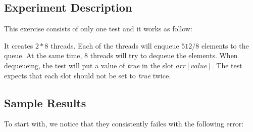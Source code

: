 \subsection{Experiment Description}
\par
This exercise consists of only one test and it works as follow:
\par
It creates $2*8$ threads. Each of the threads will enqueue $512/8$ elements to
the queue. At the same time, $8$ threads will try to dequeue the elements. When
dequeueing, the test will put a value of \textit{true} in the slot
$arr[value]$. The test expects that each slot should not be set to
\textit{true} twice.
\par
\subsection{Sample Results}
\par
To start with, we notice that they consistently failes with the following error:
\par
